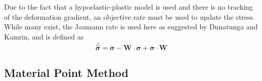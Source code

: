 Due to the fact that a hypoelastic-plastic  model is used and there is no tracking of the deformation gradient, an objective rate must be used to update the stress. While many exist, the Jaumann rate is used here as suggested by Dunatunga and Kamrin, and is defined as
$$\stackrel{\triangle}{\bm{\sigma}}=\dot{\bm{\sigma}}-\bm{W}\cdot\bm{\sigma}+\bm{\sigma}\cdot\bm{W}$$


\subsection{Material Point Method}